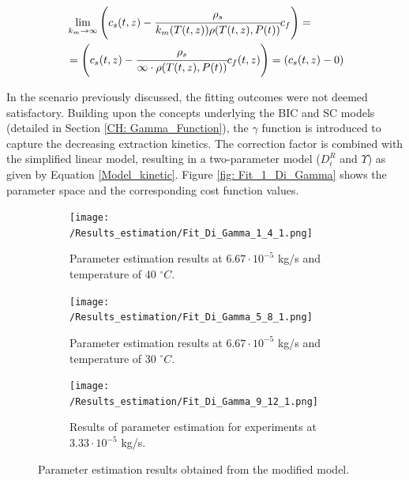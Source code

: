 \documentclass[a4paper,fleqn]{cas-dc}
\begin{document}
				{\footnotesize
					\begin{equation*}
						\begin{split}
							&\lim_{k_m \rightarrow \infty} \left({\color{black}{\color{black} c_s} }(t,z)  - \cfrac{{\color{black}\rho_s}}{{\color{black}k_m}(T(t,z)){\color{black}\rho}(T(t,z),{\color{black}P}(t))}  c_f \right)  = \\
							&= \left({\color{black}{\color{black} c_s} }(t,z)  - \cfrac{\rho_s}{\infty \cdot \rho(T(t,z),P(t))}  {c_f}(t,z) \right) = \left(c_s(t,z) - 0 \right)
						\end{split}
				\end{equation*} }
				
				In the scenario previously discussed, the fitting outcomes were not deemed satisfactory. Building upon the concepts underlying the BIC and SC models (detailed in Section \ref{CH: Gamma_Function}), the $\gamma$ function is introduced to capture the decreasing extraction kinetics. The correction factor is combined with the simplified linear model, resulting in a two-parameter model ($D_i^R$ and $\Upsilon$) as given by Equation \ref{Model_kinetic}. Figure \ref{fig: Fit_1_Di_Gamma} shows the parameter space and the corresponding cost function values.
				
				\begin{figure}[!h]
					\centering
					\begin{subfigure}{0.92\columnwidth}
						\centering
						\texttt{[image: /Results\_estimation/Fit\_Di\_Gamma\_1\_4\_1.png]}
						\caption{Parameter estimation results at $6.67\cdot 10^{-5}$ kg/s and temperature of 40 $^\circ C$.}
						\label{fig: Fit_1_4_Di_Gamma}
					\end{subfigure}
					\hfill
					\begin{subfigure}{0.92\columnwidth}
						\centering
						\texttt{[image: /Results\_estimation/Fit\_Di\_Gamma\_5\_8\_1.png]}
						\caption{Parameter estimation results at $6.67\cdot 10^{-5}$ kg/s and temperature of 30 $^\circ C$.}
						\label{fig: Fit_5_8_Di_Gamma}
					\end{subfigure}
					\hfill
					\begin{subfigure}{0.92\columnwidth}
						\centering
						\texttt{[image: /Results\_estimation/Fit\_Di\_Gamma\_9\_12\_1.png]}
						\caption{Results of parameter estimation for experiments at $3.33\cdot 10^{-5}$ kg/s.}
						\label{fig: Fit_9_12_Di_Gamma}
					\end{subfigure}
					\caption{Parameter estimation results obtained from the modified model.}
					\label{fig: Fit_Di_Gamma}
				\end{figure}
				
\end{document}
